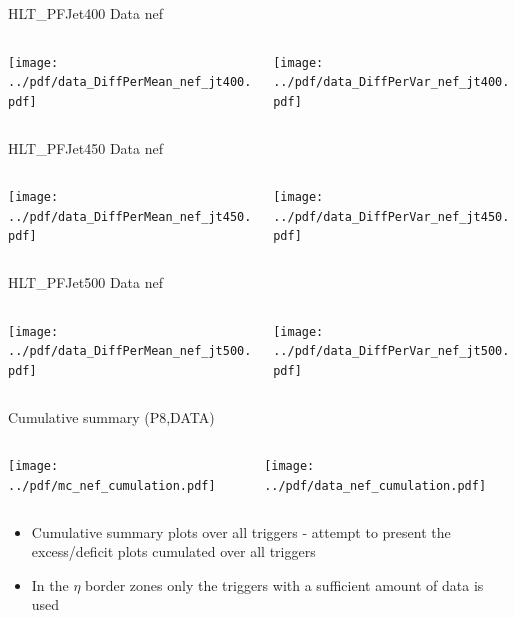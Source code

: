\documentclass[9pt]{beamer}
\begin{document}
\begin{frame}[t]{HLT\_PFJet400 Data nef}
\begin{columns}[T]
  \begin{column}{.5\textwidth}
  \texttt{[image: ../pdf/data\_DiffPerMean\_nef\_jt400.pdf]}
  \end{column}
  \begin{column}{.5\textwidth}
  \texttt{[image: ../pdf/data\_DiffPerVar\_nef\_jt400.pdf]}
  \end{column}
\end{columns}
\end{frame}

\begin{frame}[t]{HLT\_PFJet450 Data nef}
\begin{columns}[T]
  \begin{column}{.5\textwidth}
  \texttt{[image: ../pdf/data\_DiffPerMean\_nef\_jt450.pdf]}
  \end{column}
  \begin{column}{.5\textwidth}
  \texttt{[image: ../pdf/data\_DiffPerVar\_nef\_jt450.pdf]}
  \end{column}
\end{columns}
\end{frame}

\begin{frame}[t]{HLT\_PFJet500 Data nef}
\begin{columns}[T]
  \begin{column}{.5\textwidth}
  \texttt{[image: ../pdf/data\_DiffPerMean\_nef\_jt500.pdf]}
  \end{column}
  \begin{column}{.5\textwidth}
  \texttt{[image: ../pdf/data\_DiffPerVar\_nef\_jt500.pdf]}
  \end{column}
\end{columns}
\end{frame}

\begin{frame}[t]{Cumulative summary (P8,DATA)}
\begin{columns}[T]
  \begin{column}{.5\textwidth}
  \texttt{[image: ../pdf/mc\_nef\_cumulation.pdf]}
  \end{column}
  \begin{column}{.5\textwidth}
  \texttt{[image: ../pdf/data\_nef\_cumulation.pdf]}
  \end{column}
\end{columns}
\begin{itemize}
 \item Cumulative summary plots over all triggers - attempt to present the excess/deficit plots cumulated over all triggers
 \item In the $\eta$ border zones only the triggers with a sufficient amount of data is used
\end{itemize}
\end{frame}
\end{document}

